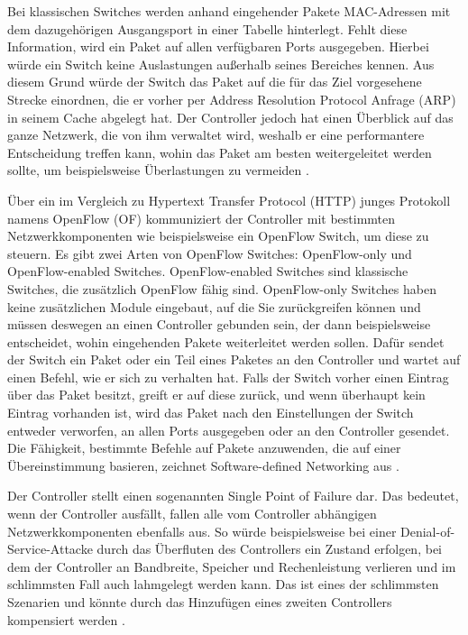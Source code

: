 \documentclass[fontsize=12pt,paper=a4,open=any,parskip=half,
  twoside=false,toc=listof,toc=bibliography,fleqn,leqno,
  captions=nooneline,captions=tableabove,british]{scrbook}
\begin{document}
Bei klassischen Switches werden anhand eingehender Pakete MAC-Adressen mit dem dazugehörigen Ausgangsport in einer Tabelle hinterlegt. Fehlt diese Information, wird ein Paket auf allen verfügbaren Ports ausgegeben. Hierbei würde ein Switch keine Auslastungen außerhalb seines Bereiches kennen. Aus diesem Grund würde der Switch das Paket auf die für das Ziel vorgesehene Strecke einordnen, die er vorher per Address Resolution Protocol Anfrage (ARP) in seinem Cache abgelegt hat. Der Controller jedoch hat einen Überblick auf das ganze Netzwerk, die von ihm verwaltet wird, weshalb er eine performantere Entscheidung treffen kann, wohin das Paket am besten weitergeleitet werden sollte, um beispielsweise Überlastungen zu vermeiden \cite[1-2]{sdn1}. \par
Über ein im Vergleich zu Hypertext Transfer Protocol (HTTP) junges Protokoll namens OpenFlow (OF) kommuniziert der Controller mit bestimmten Netzwerkkomponenten wie beispielsweise ein OpenFlow Switch, um diese zu steuern. Es gibt zwei Arten von OpenFlow Switches: OpenFlow-only und OpenFlow-enabled Switches. OpenFlow-enabled Switches sind klassische Switches, die zusätzlich OpenFlow fähig sind. OpenFlow-only Switches haben keine zusätzlichen Module eingebaut, auf die Sie zurückgreifen können und müssen deswegen an einen Controller gebunden sein, der dann beispielsweise entscheidet, wohin eingehenden Pakete weiterleitet werden sollen. Dafür sendet der Switch ein Paket oder ein Teil eines Paketes an den Controller und wartet auf einen Befehl, wie er sich zu verhalten hat. Falls der Switch vorher einen Eintrag über das Paket besitzt, greift er auf diese zurück, und wenn überhaupt kein Eintrag vorhanden ist, wird das Paket nach den Einstellungen der Switch entweder verworfen, an allen Ports ausgegeben oder an den Controller gesendet. Die Fähigkeit, bestimmte Befehle auf Pakete anzuwenden, die auf einer Übereinstimmung basieren, zeichnet Software-defined Networking aus \cite[9-10]{sdn2}. \par
Der Controller stellt einen sogenannten Single Point of Failure dar. Das bedeutet, wenn der Controller ausfällt, fallen alle vom Controller abhängigen Netzwerkkomponenten ebenfalls aus. So würde beispielsweise bei einer Denial-of-Service-Attacke durch das Überfluten des Controllers ein Zustand erfolgen, bei dem der Controller an Bandbreite, Speicher und Rechenleistung verlieren und im schlimmsten Fall auch lahmgelegt werden kann. Das ist eines der schlimmsten Szenarien und könnte durch das Hinzufügen eines zweiten Controllers kompensiert werden \cite[3]{sdn3}.
\end{document}
